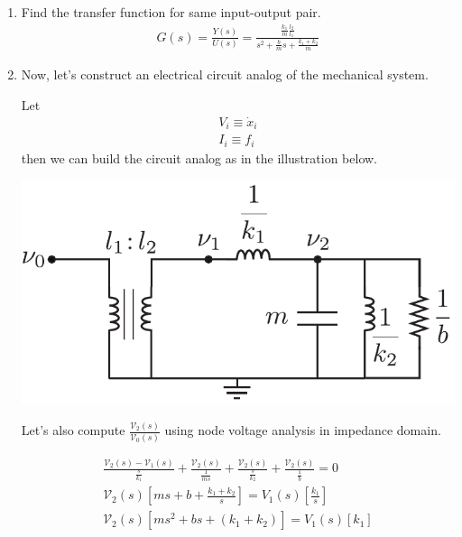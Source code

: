 \documentclass[twoside]{article}
\begin{document}
\begin{enumerate}
  \item Find the transfer function for same input-output pair.
{\large  
\begin{align*}
G(s) = \frac{Y(s)}{U(s)} = \frac{\frac{k_1}{m} \frac{l_2}{l_1}}{s^2 + \frac{b}{m} s + \frac{k_1 + k_2}{m}}  
\end{align*}
}

\item Now, let's construct an electrical circuit analog of the mechanical system.

Let 
%
\begin{align*}
	V_i \equiv \dot{x}_i
	\\
	I_i \equiv f_i
\end{align*}
%
then we can build the circuit analog as in the illustration below. 

  \begin{minipage}[h]{0.75\linewidth}
    \begin{center}
      \includegraphics[width=1\textwidth]{ex_elec}
    \end{center}
  \end{minipage}
  
  Let's also compute 
$\frac{\mathcal{V}_2(s)}{\mathcal{V_0}(s)}$ using node voltage analysis in impedance domain.

\begin{align*}
	\frac{\mathcal{V}_2(s) - \mathcal{V}_1(s) }{ \frac{s}{k_1} } + 
	\frac{\mathcal{V}_2(s)}{ \frac{1}{m s} } + 	\frac{\mathcal{V}_2(s)}{ \frac{s}{k_2} } +
	\frac{\mathcal{V}_2(s)}{ \frac{1}{b} } 
	= 0 
	\\
	\mathcal{V}_2(s) \left[ m s + b + \frac{k_1+k_2}{s} \right] = V_1(s) \left[  \frac{k_1}{s} \right]
	\\
	\mathcal{V}_2(s) \left[ m s^2 + b s + ( k_1 + k_2) \right] = V_1(s) \left[  k_1 \right]
\end{align*}


\end{enumerate}
\end{document}
